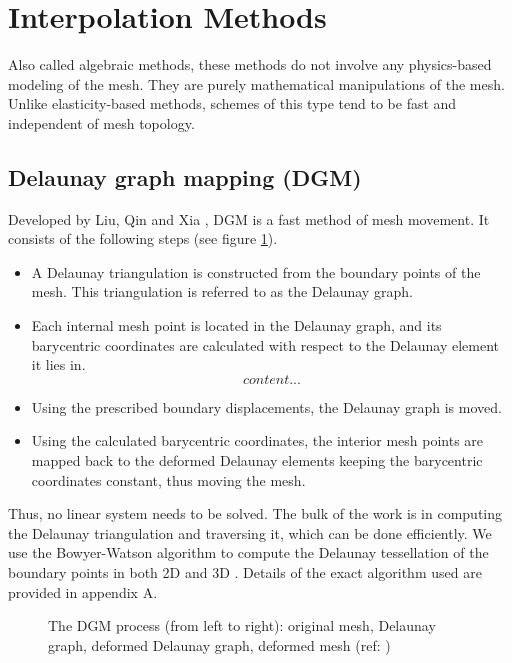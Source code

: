  \section{Interpolation  Methods}
 Also called algebraic methods, these methods do not involve any physics-based modeling of the mesh. They are purely mathematical manipulations of the mesh. Unlike elasticity-based methods, schemes of this type tend to be fast and independent of mesh topology.
 
 \subsection{Delaunay graph mapping (DGM)}
 \label{sec:dgm}
 Developed by Liu, Qin and Xia \cite{mm:dgm}, DGM is a fast method of mesh movement. It consists of the following steps (see figure \ref{fig:dgmprocess}).
 \begin{itemize}
 	\item A Delaunay triangulation is constructed from the boundary points of the mesh. This triangulation is referred to as the Delaunay graph.
 	\item Each internal mesh point is located in the Delaunay graph, and its barycentric coordinates are calculated with respect to the Delaunay element it lies in.
 	\begin{equation}
 	content...
 	\end{equation}
 	\item Using the prescribed boundary displacements, the Delaunay graph is moved.
 	\item Using the calculated barycentric coordinates, the interior mesh points are mapped back to the deformed Delaunay elements keeping the barycentric coordinates constant, thus moving the mesh.
 \end{itemize}
 Thus, no linear system needs to be solved. The bulk of the work is in computing the Delaunay triangulation and traversing it, which can be done efficiently. We use the Bowyer-Watson algorithm to compute the Delaunay tessellation of the boundary points in both 2D and 3D \cite{bowyer}. Details of the exact algorithm used are provided in appendix A.
 
 \begin{figure}
 	\centering
 	\caption{The DGM process (from left to right): original mesh, Delaunay graph, deformed Delaunay graph, deformed mesh (ref: \cite{mm:dgm})}
 	\label{fig:dgmprocess}
 \end{figure}
 

